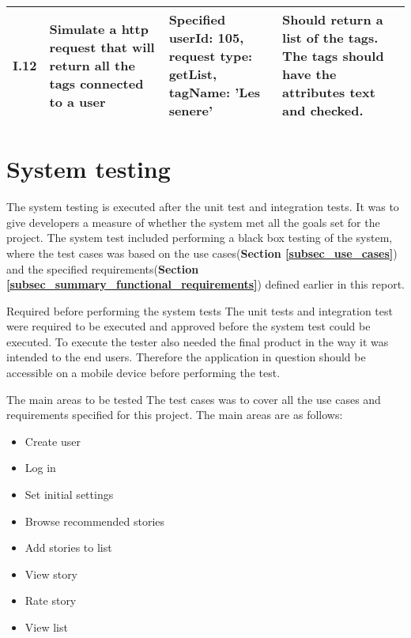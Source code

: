 {{\begin{longtable}{ | p{1cm} | p{6.5cm} | p{3cm} | p{6.5cm} |}
					
			I.12 & Simulate a http request that will return all the tags connected to a user  & Specified userId: 105, \newline request type: getList, \newline tagName: 'Les senere' & Should return a list of the tags. The tags should have the attributes text and checked. \\ \hline	

\end{longtable}

\section{System testing}

The system testing is executed after the unit test and integration tests. It was to give developers a measure of whether the system met all the goals set for the project.  The system test included performing a black box testing of the system, where the test cases was based on the use cases(\textbf{Section \ref{subsec_use_cases}}) and the specified requirements(\textbf{Section \ref{subsec_summary_functional_requirements}})  defined earlier in this report. \newline

Required before performing the system tests\newline
The unit tests and integration test were required to be executed and approved before the system test could be executed. To execute the tester also needed the final product in the way it was intended to the end users. Therefore the application in question should be accessible on a mobile device before performing the test. \newline

The main areas to be tested\newline
The test cases was to cover all the use cases and requirements specified for this project. The main areas are as follows:
\begin{itemize}
	\item Create user
	\item Log in
	\item Set initial settings
	\item Browse recommended stories
	\item Add stories to list
	\item View story
	\item Rate story 
	\item View list \newline
\end{itemize}

}}
